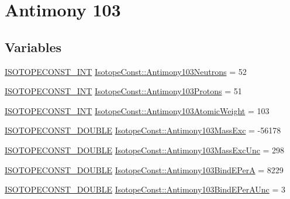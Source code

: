 \hypertarget{group___isotope_const-_antimony-_sb103}{}\section{Antimony 103}
\label{group___isotope_const-_antimony-_sb103}
\subsection*{Variables}
\begin{DoxyCompactItemize}
\item 
\mbox{\hyperlink{group___isotope_const-_macros_ga5f18360b3e99483a35c32d789e62621c}{I\+S\+O\+T\+O\+P\+E\+C\+O\+N\+S\+T\+\_\+\+I\+NT}} \mbox{\hyperlink{group___isotope_const-_antimony-_sb103_ga89cf8788ffdbcf34f563fff67e295ffc}{Isotope\+Const\+::\+Antimony103\+Neutrons}} = 52
\item 
\mbox{\hyperlink{group___isotope_const-_macros_ga5f18360b3e99483a35c32d789e62621c}{I\+S\+O\+T\+O\+P\+E\+C\+O\+N\+S\+T\+\_\+\+I\+NT}} \mbox{\hyperlink{group___isotope_const-_antimony-_sb103_gaaa99a000e966453f0d89d4ca75f607d6}{Isotope\+Const\+::\+Antimony103\+Protons}} = 51
\item 
\mbox{\hyperlink{group___isotope_const-_macros_ga5f18360b3e99483a35c32d789e62621c}{I\+S\+O\+T\+O\+P\+E\+C\+O\+N\+S\+T\+\_\+\+I\+NT}} \mbox{\hyperlink{group___isotope_const-_antimony-_sb103_gaf7e30b3d3e62a66c792acb3826686b4d}{Isotope\+Const\+::\+Antimony103\+Atomic\+Weight}} = 103
\item 
\mbox{\hyperlink{group___isotope_const-_macros_ga8f45a7272ce02c0b4c65c44636ed719a}{I\+S\+O\+T\+O\+P\+E\+C\+O\+N\+S\+T\+\_\+\+D\+O\+U\+B\+LE}} \mbox{\hyperlink{group___isotope_const-_antimony-_sb103_gaaa7b7b76e1c26009fdbb6336d788c717}{Isotope\+Const\+::\+Antimony103\+Mass\+Exc}} = -\/56178
\item 
\mbox{\hyperlink{group___isotope_const-_macros_ga8f45a7272ce02c0b4c65c44636ed719a}{I\+S\+O\+T\+O\+P\+E\+C\+O\+N\+S\+T\+\_\+\+D\+O\+U\+B\+LE}} \mbox{\hyperlink{group___isotope_const-_antimony-_sb103_ga2b6cd43c04781f1af37d20fb25e17804}{Isotope\+Const\+::\+Antimony103\+Mass\+Exc\+Unc}} = 298
\item 
\mbox{\hyperlink{group___isotope_const-_macros_ga8f45a7272ce02c0b4c65c44636ed719a}{I\+S\+O\+T\+O\+P\+E\+C\+O\+N\+S\+T\+\_\+\+D\+O\+U\+B\+LE}} \mbox{\hyperlink{group___isotope_const-_antimony-_sb103_gad11a50270f30f486c837d353532811c0}{Isotope\+Const\+::\+Antimony103\+Bind\+E\+PerA}} = 8229
\item 
\mbox{\hyperlink{group___isotope_const-_macros_ga8f45a7272ce02c0b4c65c44636ed719a}{I\+S\+O\+T\+O\+P\+E\+C\+O\+N\+S\+T\+\_\+\+D\+O\+U\+B\+LE}} \mbox{\hyperlink{group___isotope_const-_antimony-_sb103_ga63601e655def6280e67ce1654aca22ad}{Isotope\+Const\+::\+Antimony103\+Bind\+E\+Per\+A\+Unc}} = 3

\end{DoxyCompactItemize}
